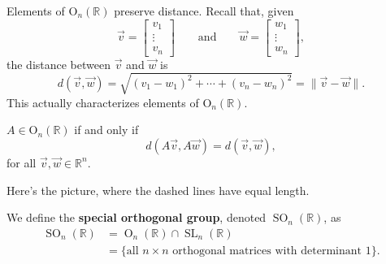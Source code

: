 Elements of $\mathrm{O}_n(\mathbb R)$ preserve distance. Recall that, given
$$\vec v=\begin{bmatrix}
	v_1 \\ \vdots \\ v_n
\end{bmatrix}\qquad\text{and}\qquad\vec w=\begin{bmatrix}
	w_1 \\ \vdots \\ w_n
\end{bmatrix},$$
the distance between $\vec v$ and $\vec w$ is
$$d(\vec v,\vec w)=\sqrt{(v_1-w_1)^2+\cdots+(v_n-w_n)^2}=\|\vec v-\vec w\|.$$
This actually characterizes elements of $\mathrm{O}_n(\mathbb R)$.

\begin{theorem}
	$A\in\mathrm{O}_n(\mathbb R)$ if and only if
	$$d(A\vec v,A\vec w)=d(\vec v,\vec w),$$
	for all $\vec v,\vec w\in\mathbb R^n$.
\end{theorem}

Here's the picture, where the dashed lines have equal length.

\begin{center}
\end{center}

\begin{definition}
	We define the \textbf{special orthogonal group}, denoted $\operatorname{SO}_n(\mathbb R)$, as
	\begin{align*}
		\operatorname{SO}_n(\mathbb R)&=\operatorname{O}_n(\mathbb R)\cap\operatorname{SL}_n(\mathbb R)\\
		&=\{\text{all $n\times n$ orthogonal matrices with determinant 1}\}.
	\end{align*}
\end{definition}


